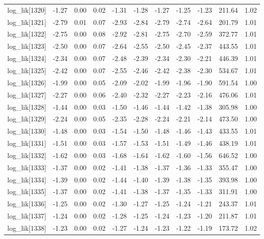 \begin{table}[ht]
\begin{tabular}{rrrrrrrrrrr}
  log\_lik[1320] & -1.27 & 0.00 & 0.02 & -1.31 & -1.28 & -1.27 & -1.25 & -1.23 & 211.64 & 1.02 \\ 
  log\_lik[1321] & -2.79 & 0.01 & 0.07 & -2.93 & -2.84 & -2.79 & -2.74 & -2.64 & 201.79 & 1.01 \\ 
  log\_lik[1322] & -2.75 & 0.00 & 0.08 & -2.92 & -2.81 & -2.75 & -2.70 & -2.59 & 372.77 & 1.01 \\ 
  log\_lik[1323] & -2.50 & 0.00 & 0.07 & -2.64 & -2.55 & -2.50 & -2.45 & -2.37 & 443.55 & 1.01 \\ 
  log\_lik[1324] & -2.34 & 0.00 & 0.07 & -2.48 & -2.39 & -2.34 & -2.30 & -2.21 & 446.39 & 1.01 \\ 
  log\_lik[1325] & -2.42 & 0.00 & 0.07 & -2.55 & -2.46 & -2.42 & -2.38 & -2.30 & 534.67 & 1.01 \\ 
  log\_lik[1326] & -1.99 & 0.00 & 0.05 & -2.09 & -2.02 & -1.99 & -1.96 & -1.90 & 591.54 & 1.00 \\ 
  log\_lik[1327] & -2.27 & 0.00 & 0.06 & -2.40 & -2.32 & -2.27 & -2.23 & -2.16 & 476.06 & 1.01 \\ 
  log\_lik[1328] & -1.44 & 0.00 & 0.03 & -1.50 & -1.46 & -1.44 & -1.42 & -1.38 & 305.98 & 1.00 \\ 
  log\_lik[1329] & -2.24 & 0.00 & 0.05 & -2.35 & -2.28 & -2.24 & -2.21 & -2.14 & 473.50 & 1.00 \\ 
  log\_lik[1330] & -1.48 & 0.00 & 0.03 & -1.54 & -1.50 & -1.48 & -1.46 & -1.43 & 433.55 & 1.01 \\ 
  log\_lik[1331] & -1.51 & 0.00 & 0.03 & -1.57 & -1.53 & -1.51 & -1.49 & -1.46 & 438.19 & 1.01 \\ 
  log\_lik[1332] & -1.62 & 0.00 & 0.03 & -1.68 & -1.64 & -1.62 & -1.60 & -1.56 & 646.52 & 1.00 \\ 
  log\_lik[1333] & -1.37 & 0.00 & 0.02 & -1.41 & -1.38 & -1.37 & -1.36 & -1.33 & 355.47 & 1.00 \\ 
  log\_lik[1334] & -1.39 & 0.00 & 0.02 & -1.44 & -1.40 & -1.39 & -1.38 & -1.35 & 393.98 & 1.00 \\ 
  log\_lik[1335] & -1.37 & 0.00 & 0.02 & -1.41 & -1.38 & -1.37 & -1.35 & -1.33 & 311.91 & 1.00 \\ 
  log\_lik[1336] & -1.25 & 0.00 & 0.02 & -1.30 & -1.27 & -1.25 & -1.24 & -1.21 & 243.37 & 1.01 \\ 
  log\_lik[1337] & -1.24 & 0.00 & 0.02 & -1.28 & -1.25 & -1.24 & -1.23 & -1.20 & 211.87 & 1.01 \\ 
  log\_lik[1338] & -1.23 & 0.00 & 0.02 & -1.27 & -1.24 & -1.23 & -1.22 & -1.19 & 173.72 & 1.02 \\ 

\end{tabular}
\end{table}
